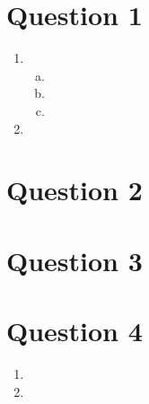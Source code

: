
\section{Question 1}
\begin{enumerate}
	\item 
	\begin{enumerate}[(a)]
		\item 
		\item 
		\item 
	\end{enumerate}
	\item 
\end{enumerate}

\section{Question 2}

\section{Question 3}

\section{Question 4}
\begin{enumerate}
	\item 
	\item 
\end{enumerate}

